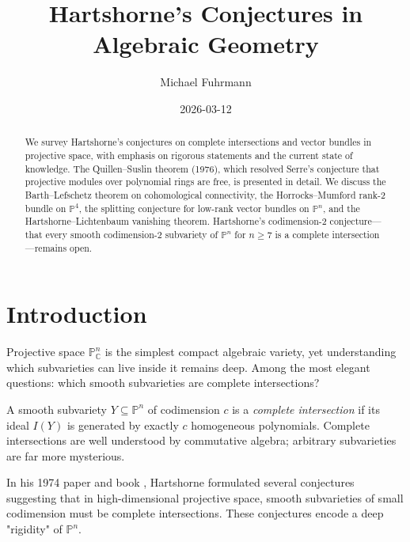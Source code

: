 \documentclass[12pt,a4paper]{amsart}
\theoremstyle{definition}
\theoremstyle{remark}
\newcommand{\PP}{\mathbb{P}}
\newcommand{\CC}{\mathbb{C}}
\begin{document}
\begin{abstract}
We survey Hartshorne's conjectures on complete intersections and vector
bundles in projective space, with emphasis on rigorous statements and the
current state of knowledge.  The Quillen--Suslin theorem (1976), which
resolved Serre's conjecture that projective modules over polynomial rings
are free, is presented in detail.  We discuss the Barth--Lefschetz theorem
on cohomological connectivity, the Horrocks--Mumford rank-2 bundle on $\PP^4$,
the splitting conjecture for low-rank vector bundles on $\PP^n$, and the
Hartshorne--Lichtenbaum vanishing theorem.  Hartshorne's codimension-2
conjecture---that every smooth codimension-2 subvariety of $\PP^n$ for
$n \ge 7$ is a complete intersection---remains open.
\end{abstract}

\title{Hartshorne's Conjectures in Algebraic Geometry}

\author{Michael Fuhrmann}
\address{Specialist Mathematics Project, Build 169}
\date{2026-03-12}

\maketitle
\tableofcontents

\section{Introduction}

Projective space $\PP^n_\CC$ is the simplest compact algebraic variety, yet
understanding which subvarieties can live inside it remains deep.  Among the
most elegant questions: which smooth subvarieties are complete intersections?

A smooth subvariety $Y \subseteq \PP^n$ of codimension $c$ is a
\emph{complete intersection} if its ideal $I(Y)$ is generated by exactly
$c$ homogeneous polynomials.  Complete intersections are well understood by
commutative algebra; arbitrary subvarieties are far more mysterious.

In his 1974 paper \cite{Hartshorne1974} and book \cite{Hartshorne1977},
Hartshorne formulated several conjectures suggesting that in high-dimensional
projective space, smooth subvarieties of small codimension must be complete
intersections.  These conjectures encode a deep "rigidity" of $\PP^n$.
\end{document}
